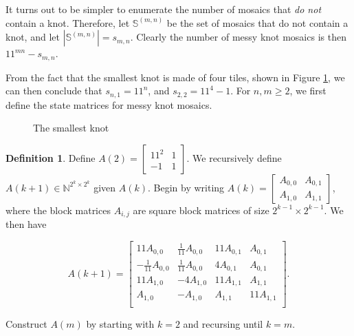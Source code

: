 \documentclass[12pt]{article}
\theoremstyle{plain}
\theoremstyle{definition}
\newtheorem{definition}{Definition}[section]
\theoremstyle{remark}
\theoremstyle{definition}
\newcommand{\cellA}[4]{\draw[red, thick, densely dotted] ( #1 + 0.5 , #2 ) arc(0:90:{0.5}); \draw[thick] ( #1 , #2 ) rectangle ( #3 , #4 );}
\newcommand{\cellB}[4]{\draw[red, thick, densely dotted] ( #1 + 1 , #2 + 0.5 ) arc(90:180:{0.5}); \draw[thick] ( #1 , #2 ) rectangle ( #3 , #4 );}
\newcommand{\cellC}[4]{\draw[red, thick, densely dotted] ( #1 + 0.5, #2 + 1 ) arc(180:270:{0.5}); \draw[thick] ( #1 , #2 ) rectangle ( #3 , #4 );}
\newcommand{\cellD}[4]{\draw[red, thick, densely dotted] ( #1 , #2 + 0.5 ) arc(-90:0:{0.5}); \draw[thick] ( #1 , #2 ) rectangle ( #3 , #4 );}
\begin{document}
It turns out to be simpler to enumerate the number of mosaics that \textit{do not} contain a knot. Therefore, let $\mathbb{S}^{(m,n)}$ be the set of mosaics that do not contain a knot, and let $|\mathbb{S}^{(m,n)}| = s_{m,n}$. Clearly the number of messy knot mosaics is then $11^{mn} - s_{m,n}$.

From the fact that the smallest knot is made of four tiles, shown in Figure \ref{fig:smallest knot}, we can then conclude that $s_{n,1}=11^n$, and $s_{2,2} = 11^4 - 1$. For $n,m \geq 2$, we first define the state matrices for messy knot mosaics.

\begin{figure}[h!]
    \begin{center}
    \end{center}
    \caption{The smallest knot}
    \label{fig:smallest knot}
\end{figure}

\begin{definition}

Define $A(2) = \begin{bmatrix}
11^2 & 1 \\
-1 & 1
\end{bmatrix}$. We recursively define $A(k+1) \in \mathbb{N}^{2^{k} \times 2^{k}}$ given $A(k)$. Begin by writing
$
A(k) = \begin{bmatrix}
A_{0,0} & A_{0,1} \\
A_{1,0} & A_{1,1}
\end{bmatrix}
$, where the block matrices $A_{i,j}$ are square block matrices of size $2^{k-1} \times 2^{k-1}$. We then have

$$
A(k+1) = \begin{bmatrix}
    11A_{0,0} & \frac{1}{11}A_{0,0} & 11A_{0,1} & A_{0,1} \\
    -\frac{1}{11}A_{0,0} & \frac{1}{11}A_{0,0} & 4A_{0,1} & A_{0,1} \\
    11A_{1,0} & -4A_{1,0} & 11A_{1,1}  & A_{1,1} \\
    A_{1,0} & -A_{1,0} & A_{1,1} & 11A_{1,1} \\
\end{bmatrix}.
$$

Construct $A(m)$ by starting with $k=2$ and recursing until $k=m$. 

\end{definition}
\end{document}
